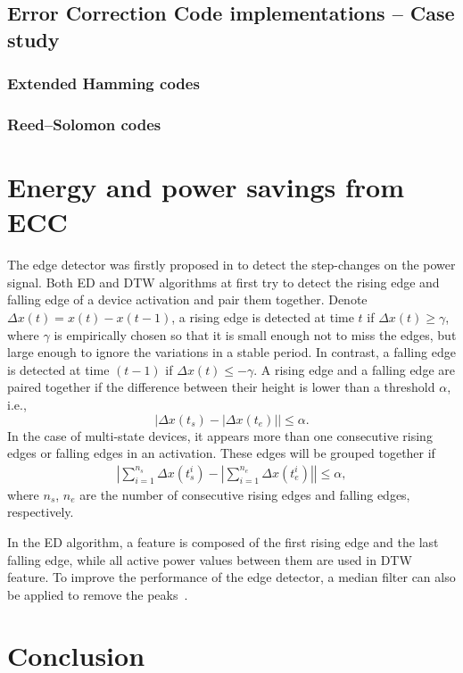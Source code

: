 

\subsection{Error Correction Code implementations -- Case study}\label{sec:algo}
\subsubsection{Extended Hamming codes }\label{CPH}


\subsubsection{Reed--Solomon codes}\label{DP}






\section{Energy and power savings from ECC}
The edge detector was firstly proposed in \cite{Hart92} to detect the step-changes on the power signal. Both ED and DTW algorithms at first try to detect the rising edge and falling edge of a device activation and pair them together. Denote $\Delta x(t) = x(t) - x(t-1)$, a rising edge is detected at time $t$ if
$\Delta x(t)\geq \gamma$,
where $\gamma$ is empirically chosen so that it is small enough not to miss the edges, but large enough to ignore the variations in a stable period. In contrast, a falling edge is detected at time $(t-1)$ if $\Delta x(t)\leq -\gamma$. A rising edge and a falling edge are paired together if the difference between their height is lower than a threshold $\alpha$, i.e.,
\begin{equation}
|\Delta x(t_s) - |\Delta x(t_e)||\leq \alpha.
\end{equation}
In the case of multi-state devices, it appears more than one consecutive rising edges or falling edges in an activation. These edges will be grouped together if
\begin{eqnarray}
\left|\sum_{i=1}^{n_s}{\Delta x(t_s^i)}-\left |\sum_{i=1}^{n_e}{\Delta x(t_e^i)}\right| \right|\leq \alpha,
\end{eqnarray}
where $n_s$, $n_e$ are the number of consecutive rising edges and falling edges, respectively.

In the ED algorithm, a feature is composed of the first rising edge and the last falling edge, while all active power values between them are used in DTW feature. To improve the performance of the edge detector, a median filter can also be applied to remove the peaks~\cite{Norford96,Marceau2000ECM}.





\section{Conclusion}

